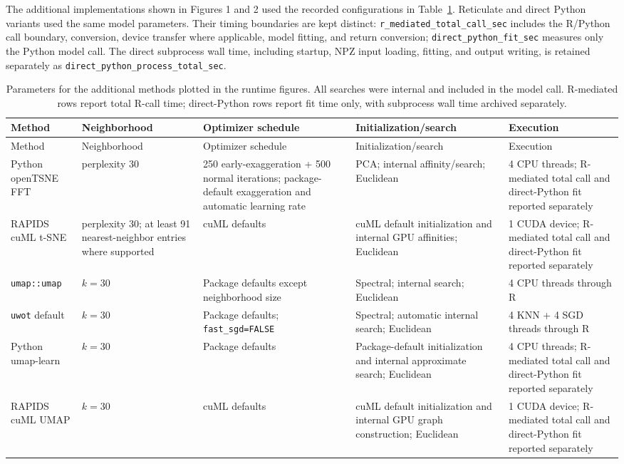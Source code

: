 \documentclass[twoside,11pt]{article}
\begin{document}
The additional implementations shown in Figures 1 and 2 used the recorded
configurations in Table~\ref{tab:additional-parameters}. Reticulate and direct
Python variants used the same model parameters. Their timing boundaries are
kept distinct: \texttt{r\_mediated\_total\_call\_sec} includes the R/Python
call boundary, conversion, device transfer where applicable, model fitting,
and return conversion; \texttt{direct\_python\_fit\_sec} measures only the
Python model call. The direct subprocess wall time, including startup, NPZ
input loading, fitting, and output writing, is retained separately as
\texttt{direct\_python\_process\_total\_sec}.

\begingroup
\scriptsize
\setlength{\tabcolsep}{2.2pt}
\begin{longtable}{p{}p{}p{}p{}p{}}
\caption{Parameters for the additional methods plotted in the runtime figures.
All searches were internal and included in the model call. R-mediated rows
report total R-call time; direct-Python rows report fit time only, with
subprocess wall time archived separately.}\label{tab:additional-parameters}\\
\toprule
Method & Neighborhood & Optimizer schedule & Initialization/search & Execution\\
\midrule
\endfirsthead
\toprule
Method & Neighborhood & Optimizer schedule & Initialization/search & Execution\\
\midrule
\endhead
Python openTSNE FFT & perplexity 30 & 250 early-exaggeration + 500 normal iterations; package-default exaggeration and automatic learning rate & PCA; internal affinity/search; Euclidean & 4 CPU threads; R-mediated total call and direct-Python fit reported separately\\
RAPIDS cuML t-SNE & perplexity 30; at least 91 nearest-neighbor entries where supported & cuML defaults & cuML default initialization and internal GPU affinities; Euclidean & 1 CUDA device; R-mediated total call and direct-Python fit reported separately\\
\texttt{umap::umap} & $k=30$ & Package defaults except neighborhood size & Spectral; internal search; Euclidean & 4 CPU threads through R\\
\texttt{uwot} default & $k=30$ & Package defaults; \texttt{fast\_sgd=FALSE} & Spectral; automatic internal search; Euclidean & 4 KNN + 4 SGD threads through R\\
Python umap-learn & $k=30$ & Package defaults & Package-default initialization and internal approximate search; Euclidean & 4 CPU threads; R-mediated total call and direct-Python fit reported separately\\
RAPIDS cuML UMAP & $k=30$ & cuML defaults & cuML default initialization and internal GPU graph construction; Euclidean & 1 CUDA device; R-mediated total call and direct-Python fit reported separately\\
\bottomrule
\end{longtable}
\endgroup
\end{document}
